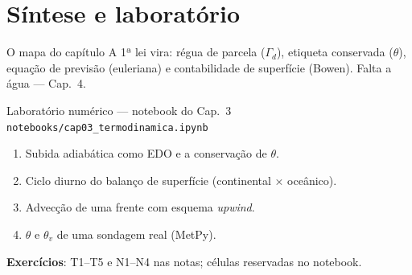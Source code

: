 \documentclass[aspectratio=169,11pt]{beamer}
\begin{document}
\section{Síntese e laboratório}

\begin{frame}{O mapa do capítulo}
  \vspace{0.6em}
  A 1ª lei vira: régua de parcela ($\Gamma_d$), etiqueta conservada
  ($\theta$), equação de previsão (euleriana) e contabilidade de
  superfície (Bowen). Falta a água — Cap.~4.
\end{frame}

\begin{frame}{Laboratório numérico --- notebook do Cap.~3}
  \texttt{notebooks/cap03\_termodinamica.ipynb}
  \begin{enumerate}
    \item Subida adiabática como EDO e a conservação de $\theta$.
    \item Ciclo diurno do balanço de superfície (continental ×
          oceânico).
    \item Advecção de uma frente com esquema \emph{upwind}.
    \item $\theta$ e $\theta_v$ de uma sondagem real (MetPy).
  \end{enumerate}
  \vspace{0.4em}
  \textbf{Exercícios}: T1--T5 e N1--N4 nas notas; células reservadas no
  notebook.
  \vfill
  \atribuicao
\end{frame}
\end{document}

